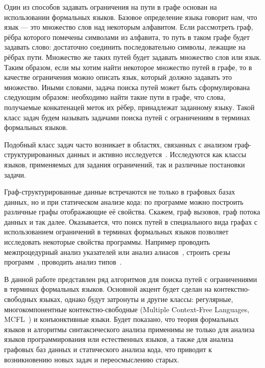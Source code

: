 Один из способов задавать ограничения на пути в графе основан на использовании формальных языков.
Базовое определение языка говорит нам, что язык --- это множество слов над некоторым алфавитом.
Если рассмотреть граф, рёбра которого помечены символами из алфавита, то путь в таком графе будет задавать слово: достаточно соединить последовательно символы, лежащие на рёбрах пути.
Множество же таких путей будет задавать множество слов или язык.
Таким образом, если мы хотим найти некоторое множество путей в графе, то в качестве ограничения можно описать язык, который должно задавать это множество.
Иными словами, задача поиска путей может быть сформулирована следующим образом: необходимо найти такие пути в графе, что слова, получаемые конкатенацей меток их рёбер, принадлежат заданному языку.
Такой класс задач будем называть задачами поиска путей с ограничениям в терминах формальных языков.

Подобный класс задач часто возникает в областях, связанных с анализом граф-структурированных данных и активно исследуется~\cite{doi:10.1137/S0097539798337716,axelsson2011formal,10.1007/978-3-642-22321-1_24,Ward:2010:CRL:1710158.1710234,barrett2007label,doi:10.1137/S0097539798337716}.
Исследуются как классы языков, применяемых для задания ограничений, так и различные постановки задачи.

Граф-структурированные данные встречаются не только в графовых базах данных, но и при статическом анализе кода: по программе можно построить различные графы отображающие её свойства.
Скажем, граф вызовов, граф потока данных и так далее.
Оказывается, что поиск путей в специального вида графах с использованием ограничений в терминах формальных языков позволяет исследовать некоторые свойства программы.
Например проводить межпроцедурный анализ указателей или анализ алиасов~\cite{Zheng,10.1145/2001420.2001440,10.1145/2714064.2660213}, строить срезы программ~\cite{10.1145/193173.195287}, проводить анализ типов~\cite{10.1145/373243.360208}.

В данной работе представлен ряд алгоритмов для поиска путей с ограничениями в терминах формальных языков.
Основной акцент будет сделан на контекстно-свободных языках, однако будут затронуты и другие классы: регулярные, многокомпонентные контекстно-свободные (Multiple Context-Free Languages, MCFL~\cite{SEKI1991191}) и конъюнктивные языки.
Будет показано, что теория формальных языков и алгоритмы синтаксического анализа применимы не только для анализа языков программирования или естественных языков, а также для анализа графовых баз данных и статического анализа кода, что приводит к возникновению новых задач и переосмыслению старых.


